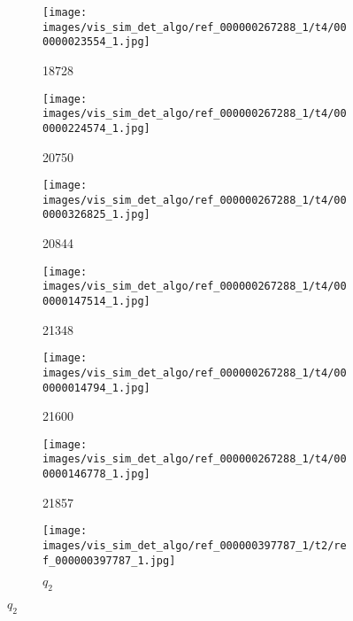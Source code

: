 \begin{figure}[h!]
\begin{subfigure}[b]{0.09\textwidth}
         \label{fig:vis_sim_img_ex_2_4}
     \end{subfigure}  
     \hfill
     \begin{subfigure}[b]{0.09\textwidth}
         \centering
         \texttt{[image: images/vis\_sim\_det\_algo/ref\_000000267288\_1/t4/000000023554\_1.jpg]}
         \caption*{18728}         
         \label{fig:vis_sim_img_ex_2_5}
     \end{subfigure}  
     \hfill
     \begin{subfigure}[b]{0.09\textwidth}
         \centering
         \texttt{[image: images/vis\_sim\_det\_algo/ref\_000000267288\_1/t4/000000224574\_1.jpg]}
         \caption*{20750}         
         \label{fig:vis_sim_img_ex_2_6}
     \end{subfigure}  
     \hfill
     \begin{subfigure}[b]{0.09\textwidth}
         \centering
         \texttt{[image: images/vis\_sim\_det\_algo/ref\_000000267288\_1/t4/000000326825\_1.jpg]}
         \caption*{20844}     
         \label{fig:vis_sim_img_ex_2_7}
     \end{subfigure}  
     \begin{subfigure}[b]{0.09\textwidth}
         \centering
         \texttt{[image: images/vis\_sim\_det\_algo/ref\_000000267288\_1/t4/000000147514\_1.jpg]}
         \caption*{21348}         
         \label{fig:vis_sim_img_ex_2_8}
     \end{subfigure}  
     \hfill
     \begin{subfigure}[b]{0.09\textwidth}
         \centering
         \texttt{[image: images/vis\_sim\_det\_algo/ref\_000000267288\_1/t4/000000014794\_1.jpg]}
         \caption*{21600}                  
         \label{fig:vis_sim_img_ex_2_9}
     \end{subfigure}  
     \hfill
     \begin{subfigure}[b]{0.09\textwidth}
         \centering
         \texttt{[image: images/vis\_sim\_det\_algo/ref\_000000267288\_1/t4/000000146778\_1.jpg]}
         \caption*{21857}
         \label{fig:vis_sim_img_ex_2_10}
     \end{subfigure}  
    \begin{subfigure}[b]{0.09\textwidth}
         \centering
         \texttt{[image: images/vis\_sim\_det\_algo/ref\_000000397787\_1/t2/ref\_000000397787\_1.jpg]}
         \caption*{$q_2$}
         \label{fig:vis_sim_img_ex_3_1}

\end{subfigure}
\end{figure}
